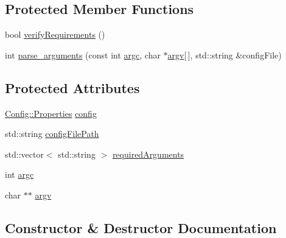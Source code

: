 \subsection*{Protected Member Functions}
\begin{DoxyCompactItemize}
\item 
bool \hyperlink{class_sample_generation_app_adb5fa7f811a3177d7966981789b41f72}{verify\+Requirements} ()
\item 
int \hyperlink{class_sample_generation_app_a4304bff49d553420b6cf436fad6f5e6a}{parse\+\_\+arguments} (const int \hyperlink{class_sample_generation_app_af98f6187cc8eb62fc3fe0ff53df76b6e}{argc}, char $\ast$\hyperlink{class_sample_generation_app_a7e490e3711491c2bc58351f9e9dd9945}{argv}\mbox{[}$\,$\mbox{]}, std\+::string \&config\+File)
\end{DoxyCompactItemize}
\subsection*{Protected Attributes}
\begin{DoxyCompactItemize}
\item 
\hyperlink{class_config_1_1_properties}{Config\+::\+Properties} \hyperlink{class_sample_generation_app_a4123900b02b2c4d61e9425d9b35da2f2}{config}
\item 
std\+::string \hyperlink{class_sample_generation_app_ad40fd006cd4f887a6458054152bf3592}{config\+File\+Path}
\item 
std\+::vector$<$ std\+::string $>$ \hyperlink{class_sample_generation_app_a1dae733636d90e8b5d27002cf513e59a}{required\+Arguments}
\item 
int \hyperlink{class_sample_generation_app_af98f6187cc8eb62fc3fe0ff53df76b6e}{argc}
\item 
char $\ast$$\ast$ \hyperlink{class_sample_generation_app_a7e490e3711491c2bc58351f9e9dd9945}{argv}
\end{DoxyCompactItemize}


\subsection{Constructor \& Destructor Documentation}
\mbox{\label{class_sample_generation_app_ac7359b551057127947243e1251237a90}} 
